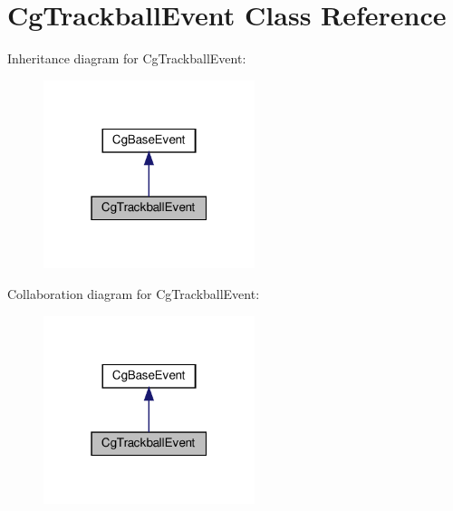 \hypertarget{class_cg_trackball_event}{}\section{Cg\+Trackball\+Event Class Reference}
\label{class_cg_trackball_event}


Inheritance diagram for Cg\+Trackball\+Event\+:
\nopagebreak
\begin{figure}[H]
\begin{center}
\leavevmode
\includegraphics[width=175pt]{class_cg_trackball_event__inherit__graph}
\end{center}
\end{figure}


Collaboration diagram for Cg\+Trackball\+Event\+:
\nopagebreak
\begin{figure}[H]
\begin{center}
\leavevmode
\includegraphics[width=175pt]{class_cg_trackball_event__coll__graph}
\end{center}
\end{figure}
